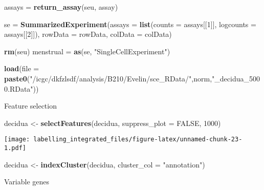 \documentclass[]{article}
\newenvironment{Shaded}{\begin{snugshade}}{\end{snugshade}}
\newcommand{\CommentTok}[1]{\textcolor[rgb]{0.56,0.35,0.01}{\textit{#1}}}
\newcommand{\DataTypeTok}[1]{\textcolor[rgb]{0.13,0.29,0.53}{#1}}
\newcommand{\DecValTok}[1]{\textcolor[rgb]{0.00,0.00,0.81}{#1}}
\newcommand{\KeywordTok}[1]{\textcolor[rgb]{0.13,0.29,0.53}{\textbf{#1}}}
\newcommand{\NormalTok}[1]{#1}
\newcommand{\OperatorTok}[1]{\textcolor[rgb]{0.81,0.36,0.00}{\textbf{#1}}}
\newcommand{\OtherTok}[1]{\textcolor[rgb]{0.56,0.35,0.01}{#1}}
\newcommand{\StringTok}[1]{\textcolor[rgb]{0.31,0.60,0.02}{#1}}
\begin{document}
\begin{Shaded}
\begin{Highlighting}[]
\NormalTok{assays =}\StringTok{ }\KeywordTok{return_assay}\NormalTok{(seu, assay)}

\NormalTok{se =}\StringTok{ }\KeywordTok{SummarizedExperiment}\NormalTok{(}\DataTypeTok{assays =} \KeywordTok{list}\NormalTok{(}\DataTypeTok{counts =}\NormalTok{ assays[[}\DecValTok{1}\NormalTok{]], }\DataTypeTok{logcounts =}\NormalTok{ assays[[}\DecValTok{2}\NormalTok{]]), }\DataTypeTok{rowData =}\NormalTok{ rowData, }\DataTypeTok{colData =}\NormalTok{ colData)}

\KeywordTok{rm}\NormalTok{(seu)}
\NormalTok{menstrual =}\StringTok{ }\KeywordTok{as}\NormalTok{(se, }\StringTok{"SingleCellExperiment"}\NormalTok{)}
\end{Highlighting}
\end{Shaded}

\begin{Shaded}
\begin{Highlighting}[]
\KeywordTok{load}\NormalTok{(}\DataTypeTok{file =} \KeywordTok{paste0}\NormalTok{(}\StringTok{"/icgc/dkfzlsdf/analysis/B210/Evelin/sce_RData/"}\NormalTok{,norm,}\StringTok{"_decidua_5000.RData"}\NormalTok{))}
\end{Highlighting}
\end{Shaded}

Feature selection

\begin{Shaded}
\begin{Highlighting}[]
\NormalTok{decidua <-}\StringTok{ }\KeywordTok{selectFeatures}\NormalTok{(decidua, }\DataTypeTok{suppress_plot =} \OtherTok{FALSE}\NormalTok{, }\DecValTok{1000}\NormalTok{)}
\end{Highlighting}
\end{Shaded}

\texttt{[image: labelling\_integrated\_files/figure-latex/unnamed-chunk-23-1.pdf]}

\begin{Shaded}
\begin{Highlighting}[]
\NormalTok{decidua <-}\StringTok{ }\KeywordTok{indexCluster}\NormalTok{(decidua, }\DataTypeTok{cluster_col =} \StringTok{"annotation"}\NormalTok{)}
\end{Highlighting}
\end{Shaded}

Variable genes

\begin{Shaded}
\end{Shaded}
\end{document}
